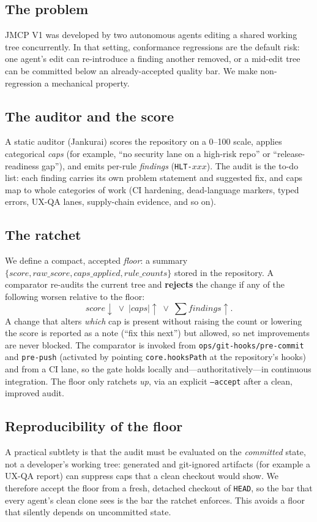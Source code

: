 \documentclass[conference]{IEEEtran}
\begin{document}
\subsection{The problem}
JMCP V1 was developed by two autonomous agents editing a shared working tree
concurrently. In that setting, conformance regressions are the default risk:
one agent's edit can re-introduce a finding another removed, or a mid-edit tree
can be committed below an already-accepted quality bar. We make non-regression
a mechanical property.

\subsection{The auditor and the score}
A static auditor (Jankurai) scores the repository on a 0--100 scale, applies
categorical \emph{caps} (for example, ``no security lane on a high-risk repo''
or ``release-readiness gap''), and emits per-rule \emph{findings}
(\texttt{HLT-}$xxx$). The audit is the to-do list: each finding carries its own
problem statement and suggested fix, and caps map to whole categories of work
(CI hardening, dead-language markers, typed errors, UX-QA lanes, supply-chain
evidence, and so on).

\subsection{The ratchet}
We define a compact, accepted \emph{floor}: a summary
$\{\textit{score}, \textit{raw\_score}, \textit{caps\_applied},
\textit{rule\_counts}\}$ stored in the repository. A comparator re-audits the
current tree and \textbf{rejects} the change if any of the following worsen
relative to the floor:
\[
\textit{score}\downarrow \;\lor\;
|\textit{caps}|\uparrow \;\lor\;
\textstyle\sum \textit{findings}\uparrow .
\]
A change that alters \emph{which} cap is present without raising the count or
lowering the score is reported as a note (``fix this next'') but allowed, so
net improvements are never blocked. The comparator is invoked from
\texttt{ops/git-hooks/pre-commit} and \texttt{pre-push} (activated by pointing
\texttt{core.hooksPath} at the repository's hooks) and from a CI lane, so the
gate holds locally and---authoritatively---in continuous integration. The floor
only ratchets \emph{up}, via an explicit \texttt{--accept} after a clean,
improved audit.

\subsection{Reproducibility of the floor}
A practical subtlety is that the audit must be evaluated on the
\emph{committed} state, not a developer's working tree: generated and
git-ignored artifacts (for example a UX-QA report) can suppress caps that a
clean checkout would show. We therefore accept the floor from a fresh,
detached checkout of \texttt{HEAD}, so the bar that every agent's clean clone
sees is the bar the ratchet enforces. This avoids a floor that silently depends
on uncommitted state.
\end{document}
